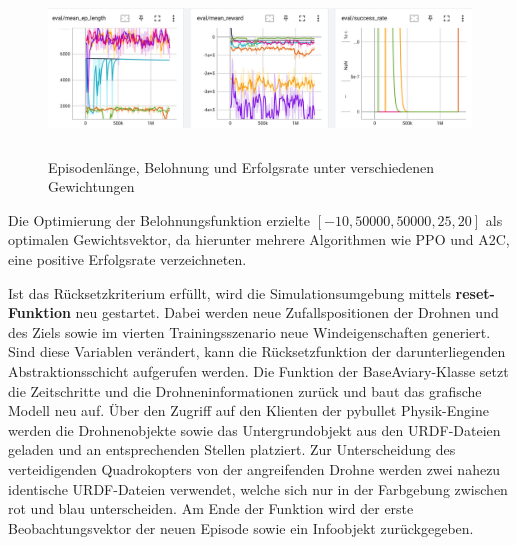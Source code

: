 \begin{figure}[htb]
    \centering
    \includegraphics[height=4.5cm]{lib/graphics/speed_reward_logs.png}
    \caption[Episodenlänge, Belohnung und Erfolgsrate unter verschiedenen Gewichtungen]{Episodenlänge, Belohnung und Erfolgsrate unter verschiedenen Gewichtungen\footnotemark}
    \label{abb:reward-logs}
\end{figure}

Die Optimierung der Belohnungsfunktion erzielte $[-10, 50000, 50000, 25, 20]$ als optimalen Gewichtsvektor, da hierunter mehrere Algorithmen wie PPO und A2C, eine positive Erfolgsrate verzeichneten.

Ist das Rücksetzkriterium erfüllt, wird die Simulationsumgebung mittels \textbf{reset-Funktion} neu gestartet.
Dabei werden neue Zufallspositionen der Drohnen und des Ziels sowie im vierten Trainingsszenario neue Windeigenschaften generiert.
Sind diese Variablen verändert, kann die Rücksetzfunktion der darunterliegenden Abstraktionsschicht aufgerufen werden.
Die Funktion der BaseAviary-Klasse setzt die Zeitschritte und die Drohneninformationen zurück und baut das grafische Modell neu auf.
Über den Zugriff auf den Klienten der pybullet Physik-Engine werden die Drohnenobjekte sowie das Untergrundobjekt aus den URDF-Dateien geladen und an entsprechenden Stellen platziert.
Zur Unterscheidung des verteidigenden Quadrokopters von der angreifenden Drohne werden zwei nahezu identische URDF-Dateien verwendet, welche sich nur in der Farbgebung zwischen rot und blau unterscheiden.
Am Ende der Funktion wird der erste Beobachtungsvektor der neuen Episode sowie ein Infoobjekt zurückgegeben.

